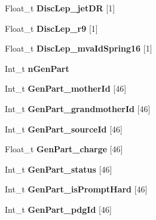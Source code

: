 \begin{DoxyCompactItemize}
\item 
\hypertarget{classMiniTree_a0cb1648e6cfbee820adb437a7fc4a3e2}{}\label{classMiniTree_a0cb1648e6cfbee820adb437a7fc4a3e2} 
Float\+\_\+t {\bfseries Disc\+Lep\+\_\+jet\+DR} \mbox{[}1\mbox{]}
\item 
\hypertarget{classMiniTree_aebeaf7545cd5efd9ab9efdb2d4edfa00}{}\label{classMiniTree_aebeaf7545cd5efd9ab9efdb2d4edfa00} 
Float\+\_\+t {\bfseries Disc\+Lep\+\_\+r9} \mbox{[}1\mbox{]}
\item 
\hypertarget{classMiniTree_aedacd115e78ef8856c4d37b597abc007}{}\label{classMiniTree_aedacd115e78ef8856c4d37b597abc007} 
Float\+\_\+t {\bfseries Disc\+Lep\+\_\+mva\+Id\+Spring16} \mbox{[}1\mbox{]}
\item 
\hypertarget{classMiniTree_a342f0d71434c021456e146b64a1fddb5}{}\label{classMiniTree_a342f0d71434c021456e146b64a1fddb5} 
Int\+\_\+t {\bfseries n\+Gen\+Part}
\item 
\hypertarget{classMiniTree_a161cdfdb787754ae15475b1484e85800}{}\label{classMiniTree_a161cdfdb787754ae15475b1484e85800} 
Int\+\_\+t {\bfseries Gen\+Part\+\_\+mother\+Id} \mbox{[}46\mbox{]}
\item 
\hypertarget{classMiniTree_aed36e1dc90474ed32bab82ce16abc2cf}{}\label{classMiniTree_aed36e1dc90474ed32bab82ce16abc2cf} 
Int\+\_\+t {\bfseries Gen\+Part\+\_\+grandmother\+Id} \mbox{[}46\mbox{]}
\item 
\hypertarget{classMiniTree_a3817335d20d5659c5a7ddd033cd811db}{}\label{classMiniTree_a3817335d20d5659c5a7ddd033cd811db} 
Int\+\_\+t {\bfseries Gen\+Part\+\_\+source\+Id} \mbox{[}46\mbox{]}
\item 
\hypertarget{classMiniTree_a8ac7e010b957e5a0c91855e7293d7f37}{}\label{classMiniTree_a8ac7e010b957e5a0c91855e7293d7f37} 
Float\+\_\+t {\bfseries Gen\+Part\+\_\+charge} \mbox{[}46\mbox{]}
\item 
\hypertarget{classMiniTree_a7725cde2485a8b8437560e27ba22540e}{}\label{classMiniTree_a7725cde2485a8b8437560e27ba22540e} 
Int\+\_\+t {\bfseries Gen\+Part\+\_\+status} \mbox{[}46\mbox{]}
\item 
\hypertarget{classMiniTree_a5ded5b9715f68635210f45a27975583e}{}\label{classMiniTree_a5ded5b9715f68635210f45a27975583e} 
Int\+\_\+t {\bfseries Gen\+Part\+\_\+is\+Prompt\+Hard} \mbox{[}46\mbox{]}
\item 
\hypertarget{classMiniTree_af55d94e694f70898f91f874d4c12ed89}{}\label{classMiniTree_af55d94e694f70898f91f874d4c12ed89} 
Int\+\_\+t {\bfseries Gen\+Part\+\_\+pdg\+Id} \mbox{[}46\mbox{]}
\item 

\end{DoxyCompactItemize}
